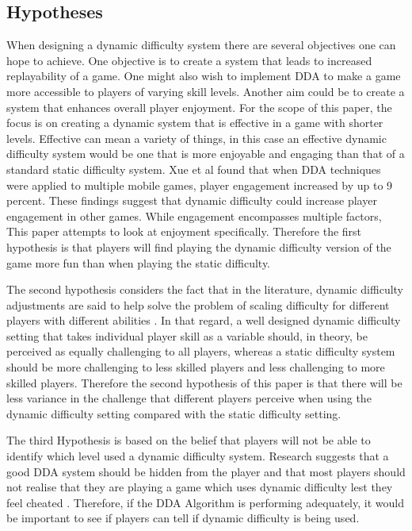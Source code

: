 \documentclass[journal]{IEEEtran}
\begin{document}
\subsection{Hypotheses}

When designing a dynamic difficulty system there are several objectives one can hope to achieve. One objective is to create a system that leads to increased replayability of a game. One might also wish to implement DDA to make a game more accessible to players of varying skill levels. Another aim could be to create a system that enhances overall player enjoyment. For the scope of this paper, the focus is on creating a dynamic system that is effective in a game with shorter levels. Effective can mean a variety of things, in this case an effective dynamic difficulty system would be one that is more enjoyable and engaging than that of a standard static difficulty system. Xue et al \cite{xue2017dynamic} found that when DDA techniques were applied to multiple mobile games, player engagement increased by up to 9 percent. These findings suggest that dynamic difficulty could increase player engagement in other games. While engagement encompasses multiple factors, This paper attempts to look at enjoyment specifically. Therefore the first hypothesis is that players will find playing the dynamic difficulty version of the game more fun than when playing the static difficulty. 

The second hypothesis considers the fact that in the literature, dynamic difficulty adjustments are said to help solve the problem of scaling difficulty for different players with different abilities \cite{missura2009player} \cite{hunicke2005case}. In that regard, a well designed dynamic difficulty setting that takes individual player skill as a variable should, in theory, be perceived as equally challenging to all players, whereas a static difficulty system should be more challenging to less skilled players and less challenging to more skilled players. Therefore the second hypothesis of this paper is that there will be less variance in the challenge that different players perceive when using the dynamic difficulty setting compared with the static difficulty setting. 

The third Hypothesis is based on the belief that players will not be able to identify which level used a dynamic difficulty system. Research suggests that a good DDA system should be hidden from the player and that most players should not realise that they are playing a game which uses dynamic difficulty lest they feel cheated \cite{hunicke2005case}. Therefore, if the DDA Algorithm is performing adequately, it would be important to see if players can tell if dynamic difficulty is being used.
\end{document}
